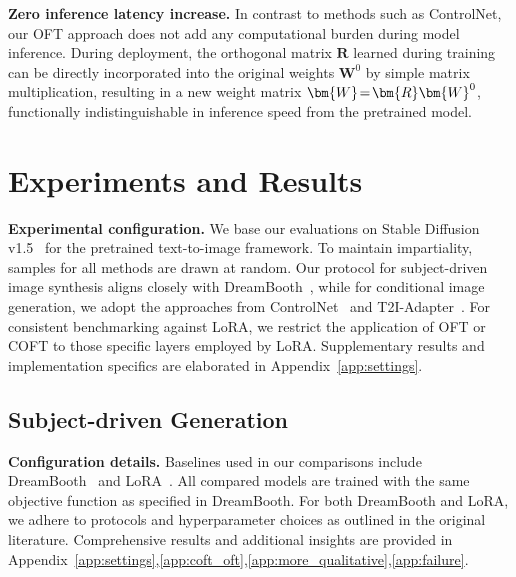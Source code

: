 {\textbf{Zero inference latency increase.} In contrast to methods such as ControlNet, our OFT approach does not add any computational burden during model inference. During deployment, the orthogonal matrix $\bm{R}$ learned during training can be directly incorporated into the original weights $\bm{W}^0$ by simple matrix multiplication, resulting in a new weight matrix $\thickmuskip=2mu \medmuskip=2mu \bm{W}=\bm{R}\bm{W}^0$, functionally indistinguishable in inference speed from the pretrained model.

\section{Experiments and Results}

\textbf{Experimental configuration.} We base our evaluations on Stable Diffusion v1.5~\cite{rombach2022high} for the pretrained text-to-image framework. To maintain impartiality, samples for all methods are drawn at random. Our protocol for subject-driven image synthesis aligns closely with DreamBooth~\cite{ruiz2023dreambooth}, while for conditional image generation, we adopt the approaches from ControlNet~\cite{zhang2023adding} and T2I-Adapter~\cite{mou2023t2i}. For consistent benchmarking against LoRA, we restrict the application of OFT or COFT to those specific layers employed by LoRA. Supplementary results and implementation specifics are elaborated in Appendix~\ref{app:settings}.

\subsection{Subject-driven Generation}

\textbf{Configuration details.} Baselines used in our comparisons include DreamBooth~\cite{ruiz2023dreambooth} and LoRA~\cite{hulora2022}. All compared models are trained with the same objective function as specified in DreamBooth. For both DreamBooth and LoRA, we adhere to protocols and hyperparameter choices as outlined in the original literature. Comprehensive results and additional insights are provided in Appendix~\ref{app:settings},\ref{app:coft_oft},\ref{app:more_qualitative},\ref{app:failure}.

}
